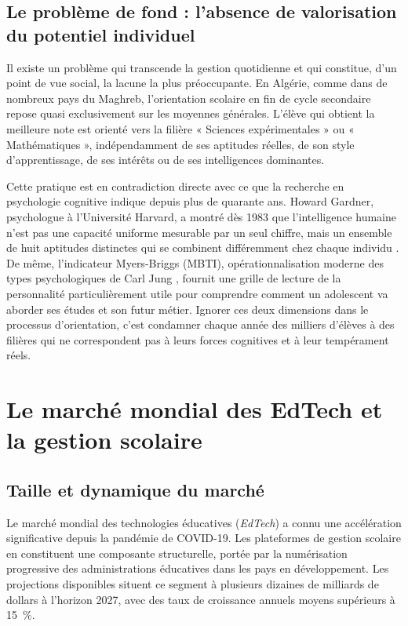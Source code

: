 \documentclass[12pt,a4paper,oneside]{report}
\begin{document}
\subsection{Le problème de fond : l'absence de valorisation du potentiel individuel}

Il existe un problème qui transcende la gestion quotidienne et qui constitue, d'un point de vue social, la lacune la plus préoccupante. En Algérie, comme dans de nombreux pays du Maghreb, l'orientation scolaire en fin de cycle secondaire repose quasi exclusivement sur les moyennes générales. L'élève qui obtient la meilleure note est orienté vers la filière « Sciences expérimentales » ou « Mathématiques », indépendamment de ses aptitudes réelles, de son style d'apprentissage, de ses intérêts ou de ses intelligences dominantes.

Cette pratique est en contradiction directe avec ce que la recherche en psychologie cognitive indique depuis plus de quarante ans. Howard Gardner, psychologue à l'Université Harvard, a montré dès 1983 que l'intelligence humaine n'est pas une capacité uniforme mesurable par un seul chiffre, mais un ensemble de huit aptitudes distinctes qui se combinent différemment chez chaque individu \autocite{gardner1983frames}. De même, l'indicateur Myers-Briggs (MBTI), opérationnalisation moderne des types psychologiques de Carl Jung \autocite{myers1980gifts}, fournit une grille de lecture de la personnalité particulièrement utile pour comprendre comment un adolescent va aborder ses études et son futur métier. Ignorer ces deux dimensions dans le processus d'orientation, c'est condamner chaque année des milliers d'élèves à des filières qui ne correspondent pas à leurs forces cognitives et à leur tempérament réels.

\section{Le marché mondial des EdTech et la gestion scolaire}

\subsection{Taille et dynamique du marché}

Le marché mondial des technologies éducatives (\textit{EdTech}) a connu une accélération significative depuis la pandémie de COVID-19. Les plateformes de gestion scolaire en constituent une composante structurelle, portée par la numérisation progressive des administrations éducatives dans les pays en développement. Les projections disponibles situent ce segment à plusieurs dizaines de milliards de dollars à l'horizon 2027, avec des taux de croissance annuels moyens supérieurs à 15~\%.
\end{document}
